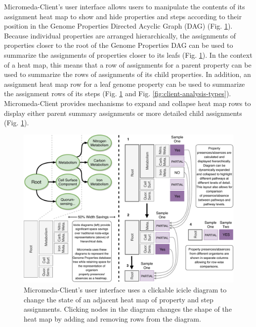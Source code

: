 Micromeda-Client's user interface allows users to manipulate the contents of its assignment heat map to show and hide properties and steps according to their position in the Genome Properties Directed Acyclic Graph (DAG) (Fig. \ref{fig:visualization-philosophy}). Because individual properties are arranged hierarchically, the assignments of properties closer to the root of the Genome Properties DAG can be used to summarize the assignments of properties closer to its leafs (Fig. \ref{fig:visualization-philosophy}). In the context of a heat map, this means that a row of assignments for a parent property can be used to summarize the rows of assignments of its child properties. In addition, an assignment heat map row for a leaf genome property can be used to summarize the assignment rows of its steps (Fig. \ref{fig:visualization-philosophy} and Fig. \ref{fig:client-analysis-types}). Micromeda-Client provides mechanisms to expand and collapse heat map rows to display either parent summary assignments or more detailed child assignments (Fig. \ref{fig:visualization-philosophy}).

\begin{figure}[!ht]
  \centering
	\includegraphics[width=\textwidth]{media/visualization_design_philosphy.pdf}
	 \caption{Micromeda-Client's user interface uses a clickable icicle diagram to change the state of an adjacent heat map of property and step assignments. Clicking nodes in the diagram changes the shape of the heat map by adding and removing rows from the diagram.}
	 \label{fig:visualization-philosophy}
\end{figure}


